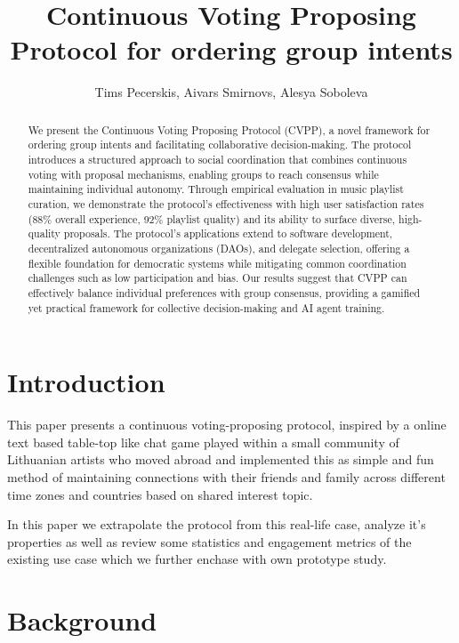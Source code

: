 \documentclass{article}
\title{Continuous Voting Proposing Protocol for ordering group intents}
\author{Tims Pecerskis, Aivars Smirnovs, Alesya Soboleva}
\begin{document}
\begin{CJK}{UTF8}{gbsn}

    \maketitle


    \begin{abstract}
        We present the Continuous Voting Proposing Protocol (CVPP), a novel framework for ordering group intents and facilitating collaborative decision-making. The protocol introduces a structured approach to social coordination that combines continuous voting with proposal mechanisms, enabling groups to reach consensus while maintaining individual autonomy. Through empirical evaluation in music playlist curation, we demonstrate the protocol's effectiveness with high user satisfaction rates (88\% overall experience, 92\% playlist quality) and its ability to surface diverse, high-quality proposals. The protocol's applications extend to software development, decentralized autonomous organizations (DAOs), and delegate selection, offering a flexible foundation for democratic systems while mitigating common coordination challenges such as low participation and bias. Our results suggest that CVPP can effectively balance individual preferences with group consensus, providing a gamified yet practical framework for collective decision-making and AI agent training.
    \end{abstract}
    \begin{multicols}{2}

        \section{Introduction}

        This paper presents a continuous voting-proposing protocol, inspired by a online text based table-top like chat game played within a small community of Lithuanian artists who moved abroad and implemented this as simple and fun method of maintaining connections with their friends and family across different time zones and countries based on shared interest topic.

        In this paper we extrapolate the protocol from this real-life case, analyze it's properties as well as review some statistics and engagement metrics of the existing use case which we further enchase with own prototype study.

        \section{Background}


\end{multicols}
\end{CJK}
\end{document}

